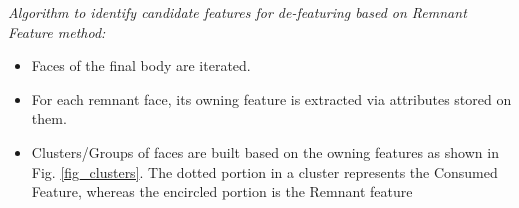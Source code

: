 {\em Algorithm to identify candidate features for de-featuring based on Remnant Feature method:}
\begin{itemize}
[noitemsep,topsep=2pt,parsep=2pt,partopsep=2pt]
\item Faces of the final body are iterated. 
\item For each remnant face, its owning feature is extracted via attributes stored on them. 
\item Clusters/Groups of faces are built based on the owning features as shown in Fig. \ref{fig_clusters}. The dotted portion in a cluster represents the Consumed Feature, whereas the encircled portion is the Remnant feature



  \begin{minipage}{0.8\textwidth}


\end{minipage}
\end{itemize}
